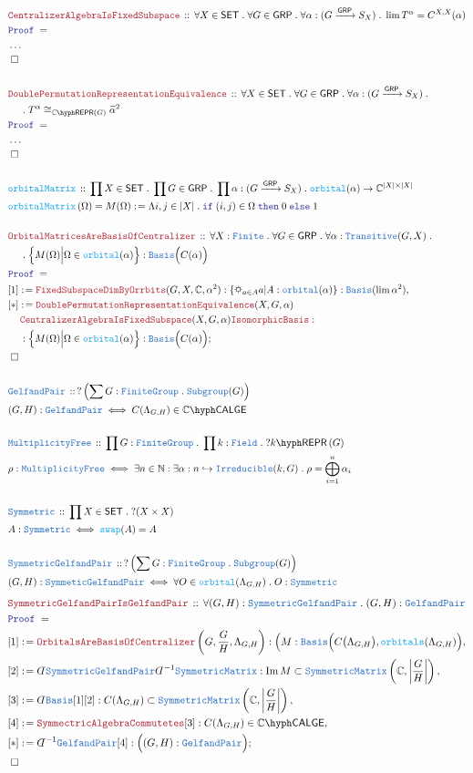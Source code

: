 \documentclass[12pt]{scrartcl}%
\newcommand{\TYPE}[1]{\textcolor{NavyBlue}{\mathtt{#1}}}%
\newcommand{\FUNC}[1]{\textcolor{Cerulean}{\mathtt{#1}}}%
\newcommand{\LOGIC}[1]{\textcolor{Blue}{\mathtt{#1}}}%
\newcommand{\THM}[1]{\textcolor{Maroon}{\mathtt{#1}}}%
\renewcommand{\.}{\; . \;} %
\newcommand{\de}{: \kern 0.1pc =} %
\newcommand{\If}{\LOGIC{if} \;} %
\newcommand{\Then}{ \; \LOGIC{then} \;} %
\newcommand{\Else}{\; \LOGIC{else} \;} %
\newcommand{\Act}[1]{\left( #1 \right)} %
\newcommand{\Theorem}[2]{& \THM{#1} \, :: \, #2 \\ & \Proof = \\ } %
\newcommand{\DeclareType}[2]{& \TYPE{#1} \, :: \, #2 \\}%
\newcommand{\DefineType}[3]{& #1 : \TYPE{#2} \iff #3 \\}%
\newcommand{\DeclareFunc}[2]{& \FUNC{#1} \, :: \, #2 \\}%
\newcommand{\DefineNamedFunc}[4]{&  \FUNC{#1}\Act{#2} = #3 \de #4 \\}%
\newcommand{\NewLine}{\\ & \kern 1pc}%
\newcommand{\Page}[1]{ \begin{align*} #1 \end{align*}  }%
\newcommand{ \bd }{ \ByDef }%
\newcommand{\NoProof}{ & \ldots \\ \EndProof}%
\newcommand{\Complex}{\mathbb{C}}%
\newcommand{\Nat}{\mathbb{N}}%
\DeclareMathOperator*{\im}{Im}%
\newcommand{\ToInj}{\hookrightarrow} %
\newcommand{\Say}[3]{& #1 \de #2 : #3, \\} %
\newcommand{\Conclude}[3]{& #1 \de #2 : #3; \\}%
\newcommand{\QED}{\; \square} %
\newcommand{\EndProof}{& \QED \\} %
\newcommand{\ByDef}{\rotatebox[origin=c]{-180}{$D$}}%
\newcommand{\Proof}{\LOGIC{Proof} \; } %
\newcommand{\Arrow}[1]{\xrightarrow{#1}}%
\newcommand{\SET}{\mathsf{SET}} %
\newcommand{\FG}{\TYPE{FiniteGroup}} %
\newcommand{\GRP}{\mathsf{GRP}} %
\newcommand{\REPR}[2]{#1\hyph\mathsf{REPR}\left(#2\right)}
\newcommand{\Basis}{\TYPE{Basis}} %
\newcommand{\Field}{\TYPE{Field}}
\newcommand{\LCALGE}[1]{#1\hyph\mathsf{CALGE}}%
\begin{document}
\Page{
	\Theorem{CentralizerAlgebraIsFixedSubspace}
	{
		\forall X \in \SET \.
		\forall G \in \GRP \.
		\forall \alpha : (G \Arrow{\GRP} S_X) \.
		\lim T^\alpha = C^{X,X}(\alpha)
	}
	\NoProof
	\\
	\Theorem{DoublePermutationRepresentationEquivalence}
	{
		\forall X \in \SET \.
		\forall G \in \GRP \.
		\forall \alpha : (G \Arrow{\GRP} S_X) \. \NewLine \. 
		T^\alpha \cong_{\REPR{\Complex}{G}} \widetilde{\alpha}^2
	}
	\NoProof
	\\
	\DeclareFunc{orbitalMatrix}
	{
		\prod X \in \SET \. 
		\prod G \in \GRP \.
		\prod \alpha : (G \Arrow{\GRP} S_X) \.
		\FUNC{orbital}(\alpha) 
		\to \Complex^{|X|\times|X|}
	}
	\DefineNamedFunc{orbitalMatrix}{\Omega}{ M(\Omega) }
	{\Lambda i,j \in |X| \.  \If (i,j) \in \Omega \Then 0 \Else 1}
	\\
	\Theorem{OrbitalMatricesAreBasisOfCentralizer}
	{
		\forall X : \TYPE{Finite} \.
		\forall G \in \GRP \.
		\forall \alpha : \TYPE{Transitive}(G,X) \. \NewLine \. 
		\Big\{ M(\Omega) \Big| \Omega \in \FUNC{orbital}(\alpha) \Big\} : \Basis\Big(C(\alpha)\Big)
	}
	\Say{[1]}{\THM{FixedSubspaceDimByOrrbits}(G,X,\Complex,\alpha^2)}
	{
		\left\{ \sun_{a \in A} a | A : \TYPE{orbital}(\alpha)  \right\} : \TYPE{Basis}(\lim \alpha^2)
	}
	\Conclude{[*]}{
		\THM{DoublePermutationRepresentationEquivalence}(X,G,\alpha)
		\NewLine
		\THM{CentralizerAlgebraIsFixedSubspace}(X,G,\alpha) 
		\THM{IsomorphicBasis}
	}
	{
		\NewLine :
		\Big\{ M(\Omega) \Big| \Omega \in \FUNC{orbital}(\alpha) \Big\} : \Basis\Big(C(\alpha)\Big)
	}
	\EndProof
	\\
	\DeclareType{GelfandPair}
	{
		?\left(\sum G : \FG \. \TYPE{Subgroup}(G) \right)
	}
	\DefineType{(G,H)}{GelfandPair}{ C(\Lambda_{G,H}) \in \LCALGE{\Complex} }
	\\
	\DeclareType{MultiplicityFree}
	{
		\prod G : \FG \.
		\prod k : \Field \.
		? \REPR{k}{G}
	}
	\DefineType{\rho}{MultiplicityFree}
	{
		\exists n \in \Nat : \exists \alpha : n \ToInj \TYPE{Irreducible}(k,G) \.
		\rho = \bigoplus^n_{i=1} \alpha_i
	}
	\\
	\DeclareType{Symmetric}{\prod X \in \SET \. ?(X \times X)}
	\DefineType{A}{Symmetric}{\FUNC{swap}(A) = A}
	\\
	\DeclareType{SymmetricGelfandPair}{ ?\left( \sum G : \FG \. \TYPE{Subgroup}(G) \right)}
	\DefineType{(G,H)}{SymmeticGelfandPair}{\forall O \in \FUNC{orbital}(\Lambda_{G,H}) \. O : \TYPE{Symmetric}} 
}
\Page{
	\Theorem{SymmetricGelfandPairIsGelfandPair}
	{
		\forall (G,H) : \TYPE{SymmetricGelfandPair} \.
		(G,H) : \TYPE{GelfandPair}
	}
	\Say{[1]}{\THM{OrbitalsAreBasisOfCentralizer}\left( G, \frac{G}{H},\Lambda_{G,H} \right)}
	{
		\Big( M : \Basis\Big( C\big(\Lambda_{G,H}\big), \FUNC{orbitals}(\Lambda_{G,H}) \Big)
	}
	\Say{[2]}{\bd \TYPE{SymmetricGelfandPair}\bd^{-1} \TYPE{SymmetricMatrix}}
	{
		\im M \subset \TYPE{SymmetricMatrix}\left( \Complex, \left| \frac{G}{H} \right| \right)
	}
	\Say{[3]}{\bd \Basis [1][2]}
	{
		C(\Lambda_{G,H}) \subset \TYPE{SymmetricMatrix}\left( \Complex, \left| \frac{G}{H} \right| \right)
	}
	\Say{[4]}{  \THM{SymmectricAlgebraCommutetes}[3]   }
	{
		C(\Lambda_{G,H}) \in \LCALGE{\Complex} 
	}
	\Conclude{[*]}{\bd^{-1} \TYPE{GelfandPair}[4]}
	{
		\Big( (G,H) : \TYPE{GelfandPair} \Big)		
	}
	\EndProof
}
\newpage
\end{document}
